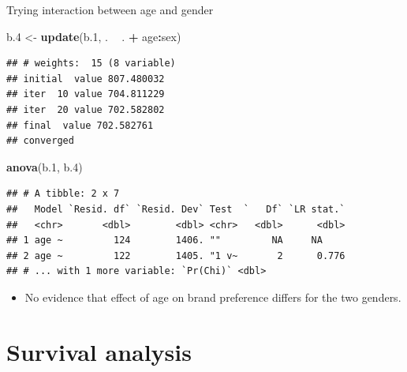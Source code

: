 \documentclass[
  ignorenonframetext,
]{beamer}
\newenvironment{Shaded}{\begin{snugshade}}{\end{snugshade}}
\newcommand{\FloatTok}[1]{\textcolor[rgb]{0.00,0.00,0.81}{#1}}
\newcommand{\KeywordTok}[1]{\textcolor[rgb]{0.13,0.29,0.53}{\textbf{#1}}}
\newcommand{\NormalTok}[1]{#1}
\newcommand{\OperatorTok}[1]{\textcolor[rgb]{0.81,0.36,0.00}{\textbf{#1}}}
\newcommand{\StringTok}[1]{\textcolor[rgb]{0.31,0.60,0.02}{#1}}
\providecommand{\tightlist}{%
  \setlength{\itemsep}{0pt}\setlength{\parskip}{0pt}}
\begin{document}
\begin{frame}[fragile]{Trying interaction between age and gender}
\protect\hypertarget{trying-interaction-between-age-and-gender}{}

\scriptsize

\begin{Shaded}
\begin{Highlighting}[]
\NormalTok{b}\FloatTok{.4}\NormalTok{ <-}\StringTok{ }\KeywordTok{update}\NormalTok{(b}\FloatTok{.1}\NormalTok{, . }\OperatorTok{~}\StringTok{ }\NormalTok{. }\OperatorTok{+}\StringTok{ }\NormalTok{age}\OperatorTok{:}\NormalTok{sex)}
\end{Highlighting}
\end{Shaded}

\begin{verbatim}
## # weights:  15 (8 variable)
## initial  value 807.480032 
## iter  10 value 704.811229
## iter  20 value 702.582802
## final  value 702.582761 
## converged
\end{verbatim}

\begin{Shaded}
\begin{Highlighting}[]
\KeywordTok{anova}\NormalTok{(b}\FloatTok{.1}\NormalTok{, b}\FloatTok{.4}\NormalTok{)}
\end{Highlighting}
\end{Shaded}

\begin{verbatim}
## # A tibble: 2 x 7
##   Model `Resid. df` `Resid. Dev` Test  `   Df` `LR stat.`
##   <chr>       <dbl>        <dbl> <chr>   <dbl>      <dbl>
## 1 age ~         124        1406. ""         NA     NA    
## 2 age ~         122        1405. "1 v~       2      0.776
## # ... with 1 more variable: `Pr(Chi)` <dbl>
\end{verbatim}

\normalsize

\begin{itemize}
\tightlist
\item
  No evidence that effect of age on brand preference differs for the two
  genders.
\end{itemize}

\end{frame}

\hypertarget{survival-analysis}{%
\section{Survival analysis}\label{survival-analysis}}
\end{document}
